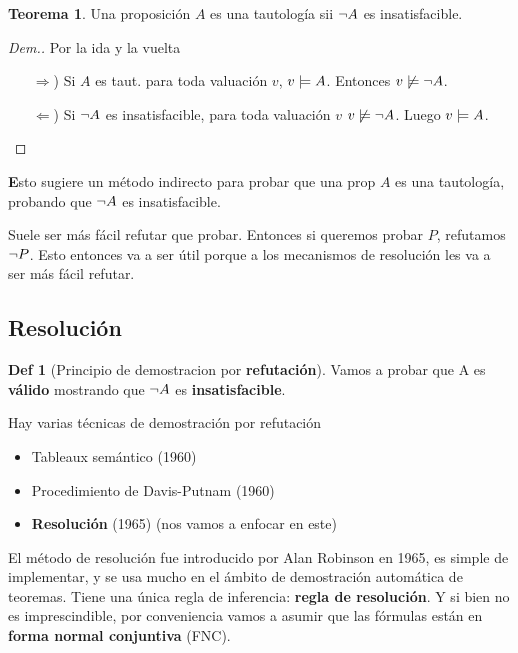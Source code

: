 \documentclass{report}
\theoremstyle{definition} %
\newtheorem{theorem}{Teorema}[chapter]
\newtheorem*{definition*}{Def}
\newenvironment{nota}[1]
    {\begin{leftbar}\textbf{#1}}
    {\end{leftbar}}
\begin{document}
\begin{theorem}\label{teo:taut-sii-insat}
    Una proposición $A$ es una tautología sii $\neg A$ es insatisfacible.
\end{theorem}
\begin{proof}[Dem.] Por la ida y la vuelta
    \begin{itemize}
        \item[$\Rightarrow$)] Si $A$ es taut. para toda valuación $v$,
        $v \models A$. Entonces $v \not\models \neg A$.
        \item[$\Leftarrow$)] Si $\neg A$ es insatisfacible, para toda valuación
        $v$ $v \not\models \neg A$. Luego $v \models A$.
    \end{itemize}
\end{proof}

\begin{nota}
Esto sugiere un método indirecto para probar que una prop $A$ es una
tautología, probando que $\neg A$ es insatisfacible.

Suele ser más fácil refutar que probar. Entonces si queremos probar $P$,
refutamos $\neg P$. Esto entonces va a ser útil porque a los mecanismos de
resolución les va a ser más fácil refutar.
\end{nota}

\subsection{Resolución}

\begin{definition*}[Principio de demostracion por \textbf{refutación}]
    Vamos a probar que A es \textbf{válido} mostrando que $\neg A$ es \textbf{insatisfacible}.
\end{definition*}

Hay varias técnicas de demostración por refutación

\begin{itemize}
    \item Tableaux semántico (1960)
    \item Procedimiento de Davis-Putnam (1960)
    \item \textbf{Resolución} (1965) (nos vamos a enfocar en este)
\end{itemize}

El método de resolución fue introducido por Alan Robinson en 1965, es simple de
implementar, y se usa mucho en el ámbito de demostración automática de teoremas.
Tiene una única regla de inferencia: \textbf{regla de resolución}. Y si bien no
es imprescindible, por conveniencia vamos a asumir que las fórmulas están en
\textbf{forma normal conjuntiva} (FNC).
\end{document}

